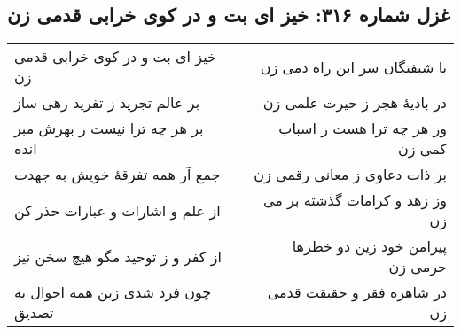 \begin{center}
\section*{غزل شماره ۳۱۶: خیز ای بت و در کوی خرابی قدمی زن}
\label{sec:316}
\begin{longtable}{l p{0.5cm} r}
خیز ای بت و در کوی خرابی قدمی زن
&&
با شیفتگان سر این راه دمی زن
\\
بر عالم تجرید ز تفرید رهی ساز
&&
در بادیهٔ هجر ز حیرت علمی زن
\\
بر هر چه ترا نیست ز بهرش مبر انده
&&
وز هر چه ترا هست ز اسباب کمی زن
\\
جمع آر همه تفرقهٔ خویش به جهدت
&&
بر ذات دعاوی ز معانی رقمی زن
\\
از علم و اشارات و عبارات حذر کن
&&
وز زهد و کرامات گذشته بر می زن
\\
از کفر و ز توحید مگو هیچ سخن نیز
&&
پیرامن خود زین دو خطرها حرمی زن
\\
چون فرد شدی زین همه احوال به تصدیق
&&
در شاهره فقر و حقیقت قدمی زن
\\
\end{longtable}
\end{center}

